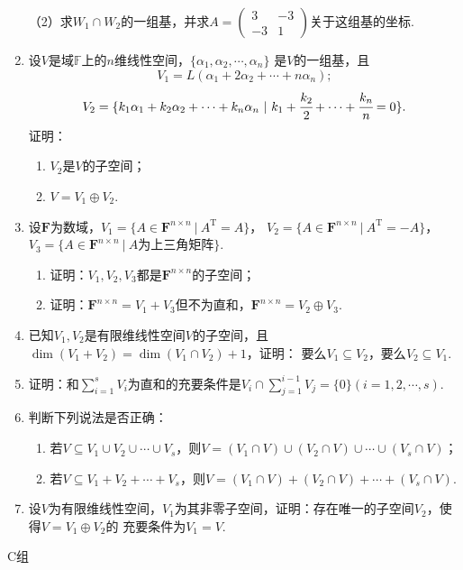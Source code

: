 \begin{enumerate}
	（2）求$W_1\cap W_2$的一组基，并求$A=\begin{pmatrix}
		3 & -3 \\ -3 & 1
	\end{pmatrix}$关于这组基的坐标.
	\item 设$V$是域$\mathbb{F}$上的$n$维线性空间，$\{\alpha_1,\alpha_2,\cdots,\alpha_n\}$
	是$V$的一组基，且
	\[V_1=L(\alpha_1+2\alpha_2+\cdots+n\alpha_n);\]
	\[V_2=\{k_1\alpha_1+k_2\alpha_2+\cdots+k_n\alpha_n\ |\ k_1+\cfrac{k_2}{2}+\cdots+\cfrac{k_n}{n}=0\}.\]
	证明：
    \begin{enumerate}[label=(\arabic*)]
        \item $V_2$是$V$的子空间；
        \item $V=V_1\oplus V_2$.
    \end{enumerate}
	\item 设$\mathbf{F}$为数域，$V_1=\{A\in\mathbf{F}^{n\times n}\ |\ A^\mathrm{T}=A\}$，
	$V_2=\{A\in\mathbf{F}^{n\times n}\ |\ A^\mathrm{T}=-A\}$，$V_3=\{A\in\mathbf{F}^{n\times n}\ |\ A$为上三角矩阵$\}$.
    \begin{enumerate}
        \item 证明：$V_1,V_2,V_3$都是$\mathbf{F}^{n\times n}$的子空间；
        \item 证明：$\mathbf{F}^{n\times n}=V_1+V_3$但不为直和，$\mathbf{F}^{n\times n}=V_2\oplus V_3$.
    \end{enumerate}
	\item 已知$V_1,V_2$是有限维线性空间$V$的子空间，且$\dim(V_1+V_2)=\dim(V_1 \cap V_2)+1$，证明：
	要么$V_1 \subseteq V_2$，要么$V_2 \subseteq V_1$.
	\item 证明：和$\sum\limits_{i=1}^{s}V_i$为直和的充要条件是$V_i \cap \sum\limits_{j=1}^{i-1}V_j=\{0\}(i=1,2,\cdots,s)$.
	\item 判断下列说法是否正确：
	\begin{enumerate}
        \item 若$V \subseteq V_1 \cup V_2 \cup \cdots \cup V_s$，则$V=(V_1 \cap V)\cup(V_2 \cap V)\cup\cdots\cup(V_s \cap V)$；
        \item 若$V \subseteq V_1+V_2+\cdots +V_s$，则$V=(V_1 \cap V)+(V_2 \cap V)+\cdots+(V_s \cap V)$.
    \end{enumerate}
	\item 设$V$为有限维线性空间，$V_1$为其非零子空间，证明：存在唯一的子空间$V_2$，使得$V=V_1\oplus V_2$的
	充要条件为$V_1=V$.
\end{enumerate}
\centerline{\heiti C组}
